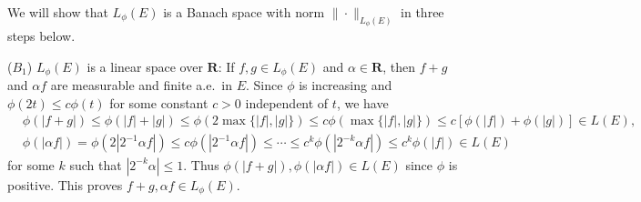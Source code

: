 \begin{exercise}{8.28} We will show that $L_\phi(E)$ is a Banach space with norm $\|\cdot\|_{L_\phi(E)}$ in three steps below.

($B_1$) $L_\phi(E)$ is a linear space over $\mathbf{R}$:
If $f,g\in L_\phi(E)$ and $\alpha\in\mathbf{R}$, then $f+g$ and $\alpha f$ are measurable and finite a.e.\ in $E$. Since $\phi$ is increasing and $\phi(2t)\leq c\phi(t)$ for some constant $c>0$ independent of $t$, we have
\begin{equation*}
    \begin{aligned}
   &\phi(|f+g|)\leq\phi(|f|+|g|)\leq \phi(2\max\{|f|,|g|\})\leq c\phi(\max\{|f|,|g|\})\leq c\left[\phi(|f|)+\phi(|g|)\right]\in L(E),\\
   &\phi(|\alpha f|)=\phi(2|2^{-1}\alpha f|)\leq c\phi(|2^{-1}\alpha f|)\leq\cdots\leq c^k\phi(|2^{-k}\alpha f|)\leq c^k\phi(|f|)\in L(E)
    \end{aligned}
\end{equation*}
for some $k$ such that $|2^{-k}\alpha |\leq 1$. Thus $\phi(|f+g|), \phi(|\alpha f|)\in L(E)$ since $\phi$ is positive. This proves $f+g,\alpha f\in L_{\phi}(E)$.


\end{exercise}
